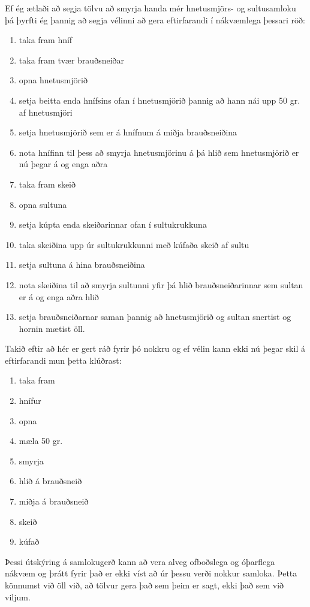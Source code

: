 Ef ég ætlaði að segja tölvu að smyrja handa mér hnetusmjörs- og sultusamloku þá þyrfti ég þannig að segja vélinni að gera eftirfarandi í nákvæmlega þessari röð:
\vspace{0.4cm}
\begin{enumerate}
	\item taka fram hníf
	\item taka fram tvær brauðsneiðar
	\item opna hnetusmjörið
	\item setja beitta enda hnífsins ofan í hnetusmjörið þannig að hann nái upp 50 gr. af hnetusmjöri
	\item setja hnetusmjörið sem er á hnífnum á miðja brauðsneiðina
	\item nota hnífinn til þess að smyrja hnetusmjörinu á þá hlið sem hnetusmjörið er nú þegar á og enga aðra
	\item taka fram skeið
	\item opna sultuna
	\item setja kúpta enda skeiðarinnar ofan í sultukrukkuna 
	\item taka skeiðina upp úr sultukrukkunni með kúfaða skeið af sultu
	\item setja sultuna á hina brauðsneiðina
	\item nota skeiðina til að smyrja sultunni yfir þá hlið brauðsneiðarinnar sem sultan er á og enga aðra hlið
	\item  setja brauðsneiðarnar saman þannig að hnetusmjörið og sultan snertist og hornin mætist öll. 
\end{enumerate} 
\vspace{0.4cm}
Takið eftir að hér er gert ráð fyrir þó nokkru og ef vélin kann ekki nú þegar skil á eftirfarandi mun þetta klúðrast: 
\vspace{0.2cm}
\begin{enumerate}
	\item taka fram
	\item hnífur
	\item opna
	\item mæla 50 gr.
	\item smyrja
	\item hlið á brauðsneið
	\item miðja á brauðsneið
	\item skeið
	\item kúfað
\end{enumerate} 
\vspace{0.2cm}

Þessi útskýring á samlokugerð kann að vera alveg ofboðslega og óþarflega nákvæm og þrátt fyrir það er ekki víst að úr þessu verði nokkur samloka.
Þetta könnumst við öll við, að tölvur gera það sem þeim er sagt, ekki það sem við viljum.

